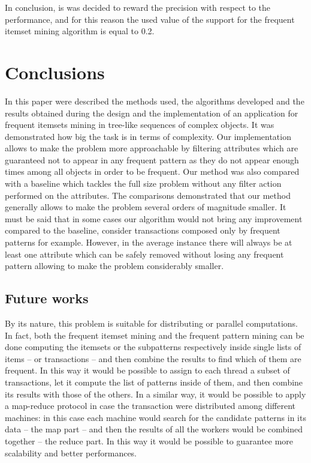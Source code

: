\documentclass{acm_proc_article-sp-sigmod09}
\begin{document}
In conclusion, is was decided to reward the precision with respect to the performance, and for this reason the used value of the support for the frequent itemset mining algorithm is equal to 0.2.

\section{Conclusions}
In this paper were described the methods used, the algorithms developed and the results obtained during the design and the implementation of an application for frequent itemsets mining in tree-like sequences of complex objects. It was demonstrated how big the task is in terms of complexity. Our implementation allows to make the problem more approachable by filtering attributes which are guaranteed not to appear in any frequent pattern as they do not appear enough times among all objects in order to be frequent. Our method was also compared with a baseline which tackles the full size problem without any filter action performed on the attributes. The comparisons demonstrated that our method generally allows to make the problem several orders of magnitude smaller. It must be said that in some cases our algorithm would not bring any improvement compared to the baseline, consider transactions composed only by frequent patterns for example. However, in the average instance there will always be at least one attribute which can be safely removed without losing any frequent pattern allowing to make the problem considerably smaller.

\subsection{Future works}
By its nature, this problem is suitable for distributing or parallel computations. In fact, both the frequent itemset mining and the frequent pattern mining can be done computing the itemsets or the subpatterns respectively inside single lists of items -- or transactions -- and then combine the results to find which of them are frequent. In this way it would be possible to assign to each thread a subset of transactions, let it compute the list of patterns inside of them, and then combine its results with those of the others. In a similar way, it would be possible to apply a map-reduce protocol in case the transaction were distributed among different machines: in this case each machine would search for the candidate patterns in its data -- the map part -- and then the results of all the workers would be combined together -- the reduce part. In this way it would be possible to guarantee more scalability and better performances.

\end{document}
